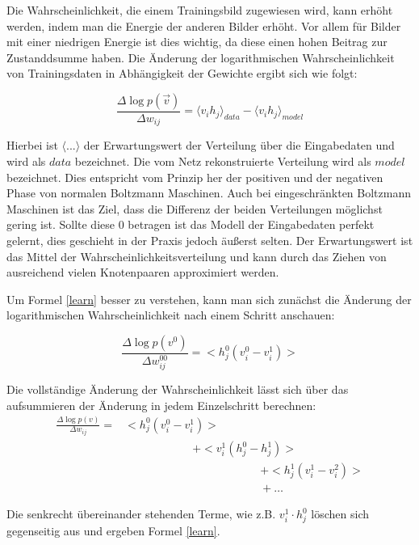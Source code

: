 \documentclass[12pt]{article}
\begin{document}
Die Wahrscheinlichkeit, die einem Trainingsbild zugewiesen wird, kann erhöht werden, indem man die Energie der anderen Bilder erhöht. Vor allem für Bilder mit einer niedrigen Energie ist dies wichtig, da diese einen hohen Beitrag zur Zustanddsumme haben. Die Änderung der logarithmischen Wahrscheinlichkeit von Trainingsdaten in Abhängigkeit der Gewichte ergibt sich wie folgt: 

\begin{equation}
\label{learn}
\frac{\Delta \log p(\vec{v})}{\Delta w_{ij}} = \langle v_ih_j \rangle_{data} - \langle v_i h_j \rangle_{model}
\end{equation}

Hierbei ist $\langle...\rangle$ der Erwartungswert der Verteilung über die Eingabedaten und wird als $data$ bezeichnet. Die vom Netz rekonstruierte Verteilung wird als $model$ bezeichnet. Dies entspricht vom Prinzip her der positiven und der negativen Phase von normalen Boltzmann Maschinen. Auch bei eingeschränkten Boltzmann Maschinen ist das Ziel, dass die Differenz der beiden Verteilungen möglichst gering ist. Sollte diese 0 betragen ist das Modell der Eingabedaten perfekt gelernt, dies geschieht in der Praxis jedoch äußerst selten. Der Erwartungswert ist das Mittel der Wahrscheinlichkeitsverteilung und kann durch das Ziehen von ausreichend vielen Knotenpaaren approximiert werden.

Um Formel \ref{learn} besser zu verstehen, kann man sich zunächst die Änderung der logarithmischen Wahrscheinlichkeit nach einem Schritt anschauen:

\begin{equation}
\frac{\Delta \log p(v^0)}{\Delta w^{00}_{ij}} = <h^0_j(v^0_i-v_i^1)>
\end{equation}

Die vollständige Änderung der Wahrscheinlichkeit lässt sich über das aufsummieren der Änderung in jedem Einzelschritt berechnen:
\begin{eqnarray}
\frac{\Delta \log p(v)}{\Delta w_{ij}}=&<h^0_j(v^0_i-v_i^1)>\\
&\qquad\qquad\qquad+<v^1_i(h^0_j-h_j^1)>\nonumber\\
&\qquad\qquad\qquad\qquad\qquad\qquad+<h^1_j(v^1_i-v_i^2)>\\\nonumber
&\qquad\qquad\qquad\qquad\qquad\qquad+\dots
\end{eqnarray}

Die senkrecht übereinander stehenden Terme, wie z.B. $v_i^1\cdot h_j^0$ löschen sich gegenseitig aus und ergeben Formel \ref{learn}.
\end{document}
